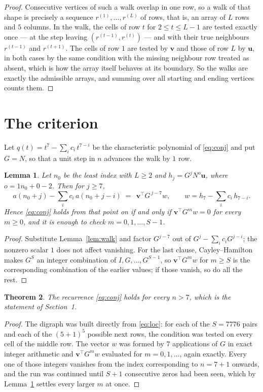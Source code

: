 \documentclass[11pt,a4paper]{article}
\theoremstyle{plain}
\newtheorem{theorem}{Theorem}
\newtheorem{lemma}[theorem]{Lemma}
\theoremstyle{definition}
\begin{document}
\begin{proof}
Consecutive vertices of such a walk overlap in one row, so a walk of that shape is
precisely a sequence $r^{(1)},\dots,r^{(L)}$ of rows, that is, an array of $L$ rows
and $5$ columns. In the walk, the cells of row $t$ for $2\le t\le L-1$ are tested
exactly once --- at the step leaving $(r^{(t-1)},r^{(t)})$ --- and with their true
neighbours $r^{(t-1)}$ and $r^{(t+1)}$. The cells of row $1$ are tested by
$\mathbf{v}$ and those of row $L$ by $\mathbf{u}$, in both cases by the same condition
with the missing neighbour row treated as absent, which is how the array itself behaves at
its boundary. So the walks are exactly the admissible arrays, and summing over all starting
and ending vertices counts them.
\end{proof}

\section{The criterion}

Let $q(t)=t^{7}-\sum_i c_i\,t^{7-i}$ be the characteristic polynomial of
\eqref{eq:conj} and put $G=N$, so that a unit step in $n$ advances the walk by
$1$ row.

\begin{lemma}\label{lem:crit}
Let $n_0$ be the least index with $L\ge2$ and $h_j=G^{j}N^{o}\mathbf{u}$, where
$o=1n_0+0-2$. Then for $j\ge7$,
\[
a(n_0+j)-\sum_i c_i\,a(n_0+j-i)\;=\;\,\mathbf{v}^{\!\top}G^{\,j-7}w,
\qquad w=h_{7}-\sum_i c_i\,h_{7-i} .
\]
Hence \eqref{eq:conj} holds from that point on if and only if
$\mathbf{v}^{\!\top}G^{m}w=0$ for every $m\ge0$, and it is enough to check
$m=0,1,\dots,S-1$.
\end{lemma}

\begin{proof}
Substitute Lemma~\ref{lem:walk} and factor $G^{j-7}$ out of
$G^{j}-\sum_ic_iG^{j-i}$; the nonzero scalar $1$ does not affect
vanishing. For the last clause, Cayley--Hamilton makes $G^{S}$ an integer combination of
$I,G,\dots,G^{S-1}$, so $\mathbf{v}^{\!\top}G^{m}w$ for $m\ge S$ is the corresponding
combination of the earlier values; if those vanish, so do all the rest.
\end{proof}

\begin{theorem}
The recurrence \eqref{eq:conj} holds for every $n>7$, which is the statement of
Section~1.
\end{theorem}

\begin{proof}
The digraph was built directly from \eqref{eq:loc}: for each of the $S=7776$ pairs and each
of the $(5+1)^{5}$ possible next rows, the condition was tested on every cell of
the middle row. The vector $w$ was formed by $7$ applications of $G$ in exact integer
arithmetic and $\mathbf{v}^{\!\top}G^{m}w$ evaluated for $m=0,1,\dots$, again exactly.
Every one of those integers vanishes from the index corresponding to $n=7+1$ onwards,
and the run was continued until $S+1$ consecutive zeros had been seen, which by
Lemma~\ref{lem:crit} settles every larger $m$ at once.
\end{proof}
\end{document}
